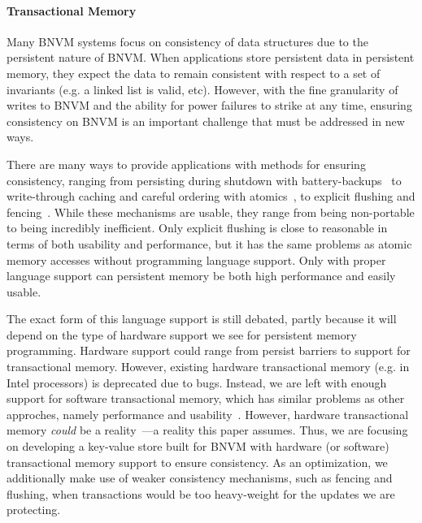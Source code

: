 \paragraph{Transactional Memory}

Many BNVM systems focus on consistency of data structures due to the
persistent nature of BNVM. When applications store persistent data in
persistent memory, they expect the data to remain consistent with respect to a
set of invariants (e.g. a linked list is valid, etc). However, with the fine
granularity of writes to BNVM and the ability for power failures to strike at
any time, ensuring consistency on BNVM is an important challenge that must be
addressed in new ways.

There are many ways to provide applications with methods for ensuring
consistency, ranging from persisting during shutdown with
battery-backups~\cite{narayanan:asplos12} to write-through caching and careful
ordering with atomics~\cite{bhandari2012implications}, to explicit flushing and
fencing~\cite{condit:sosp09}. While these mechanisms are usable, they range from
being non-portable to being incredibly inefficient. Only explicit flushing is
close to reasonable in terms of both usability and performance, but it has the
same problems as atomic memory accesses without programming language support.
Only with proper language support can persistent memory be both high performance
and easily usable.

The exact form of this language support is still debated, partly because it will
depend on the type of hardware support we see for persistent memory programming.
Hardware support could range from persist barriers to support for transactional
memory. However, existing hardware transactional memory (e.g. in Intel
processors) is deprecated due to bugs. Instead, we are left with enough support
for software transactional memory, which has similar problems as other
approches, namely performance and usability~\cite{stm}. However, hardware
transactional memory \textit{could} be a
reality~\cite{kolli:asplos16,lu:tos16,wang:cal15}---a reality this paper
assumes. Thus, we are focusing on developing a key-value store built for BNVM
with hardware (or software) transactional memory support to ensure consistency.
As an optimization, we additionally make use of weaker consistency mechanisms,
such as fencing and flushing, when transactions would be too heavy-weight for
the updates we are protecting.

